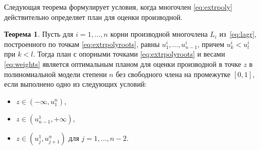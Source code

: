 \documentclass[specialist,
               substylefile = spbu.rtx,
               subf,href,colorlinks=true, 12pt]{disser}
\theoremstyle{definition}
\newtheorem{theorem}{Теорема}
\begin{document}
  Следующая теорема формулирует условия, когда многочлен \eqref{eq:extrpoly} действительно определяет план для оценки производной. 
	
	\begin{theorem}
	\label{th1}
		Пусть для $i = 1, \ldots, n$ корни производной многочлена $L_i$ из~\eqref{eq:lagr}, построенного по точкам \eqref{eq:extrpolyroots}, равны $u_1^i, \ldots, u_{n-1}^i$, причем $u_k^i < u_l^i$ при $k < l$. Тогда план с опорными точками \eqref{eq:extrpolyroots} и весами \eqref{eq:weights} является оптимальным планом для оценки производной в точке $z$ в полиномиальной модели степени $n$ без свободного члена на промежутке $[0, 1]$, если выполнено одно из следующих условий:
		\begin{itemize}
			\item $z \in (-\infty, u_1^n)$,
			\item $z \in (u_{n-1}^1, +\infty )$,
			\item $z \in \left( u^1_j, u^n_{j+1} \right)$ для $j=1, \ldots, n-2$.
		\end{itemize}
	\end{theorem}
\end{document}
